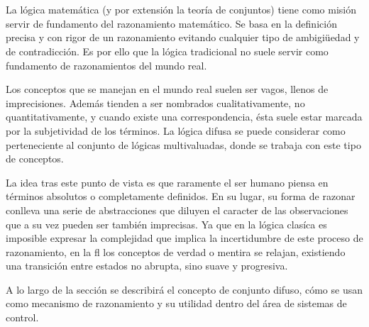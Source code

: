 \section{}

La lógica matemática (y por extensión la teoría de conjuntos) tiene como misión servir de fundamento del razonamiento matemático. Se basa en la definición precisa y con rigor de un razonamiento evitando cualquier tipo de ambigiüedad y de contradicción. Es por ello que la lógica tradicional no suele servir como fundamento de razonamientos del mundo real.

Los conceptos que se manejan en el mundo real suelen ser vagos, llenos de imprecisiones. Además tienden a ser nombrados cualitativamente, no quantitativamente, y cuando existe una correspondencia, ésta suele estar marcada por la subjetividad de los términos. La lógica difusa se puede considerar como perteneciente al conjunto de lógicas multivaluadas, donde se trabaja con este tipo de conceptos.

La idea tras este punto de vista es que raramente el ser humano piensa en términos absolutos o completamente definidos. En su lugar, su forma de razonar conlleva una serie de abstracciones que diluyen el caracter de las observaciones que a su vez pueden ser también imprecisas. Ya que en la lógica clasíca es imposible expresar la complejidad que implica la incertidumbre de este proceso de razonamiento, en la \ac{fl} los conceptos de verdad o mentira se relajan, existiendo una transición entre estados no abrupta, sino suave y progresiva.

A lo largo de la sección se describirá el concepto de conjunto difuso, cómo se usan como mecanismo de razonamiento y su utilidad dentro del área de sistemas de control.

